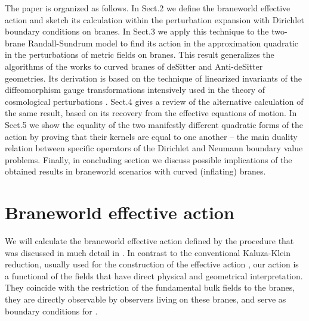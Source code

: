 \documentclass[a4paper,12pt]{article}
\begin{document}
The paper is organized as follows. In Sect.2 we define the
braneworld effective action and sketch its calculation within the
perturbation expansion with Dirichlet boundary conditions on
branes. In Sect.3 we apply this technique to the two-brane
Randall-Sundrum model \cite{RS} to find its action in the
approximation quadratic in the perturbations of metric fields on
branes. This result generalizes the algorithms of the works
\cite{brane, BWEA} to curved branes of deSitter and Anti-deSitter
geometries. Its derivation is based on the technique of linearized
invariants of the diffeomorphism gauge transformations intensively
used in the theory of cosmological perturbations
\cite{BFM,GarMonTanSas,efeqmy}. Sect.4 gives a review of the
alternative calculation \cite{BWEA} of the same result, based on
its recovery from the effective equations of motion. In Sect.5 we
show the equality of the two manifestly different quadratic forms
of the action by proving that their kernels are equal to one
another -- the main duality relation between specific operators of
the Dirichlet and Neumann boundary value problems. Finally, in
concluding section we discuss possible implications of the
obtained results in braneworld scenarios with curved (inflating)
branes.


\section{Braneworld effective action}
\hspace{\parindent}We will calculate the braneworld effective
action defined by the procedure that was discussed in much detail
in \cite{BWEA}. In contrast to the conventional Kaluza-Klein
reduction, usually used for the construction of the effective
action \cite{KubVol,Kub}, our action is a functional of the fields
that have direct physical and geometrical interpretation. They
coincide with the restriction \myHighlight{$\phi$}\coordHE{} of the fundamental bulk
fields \myHighlight{$\Phi$}\coordHE{} to the branes, they are directly observable by
observers living on these branes, and serve as boundary conditions
for \myHighlight{$\Phi$}\coordHE{}.
\end{document}
